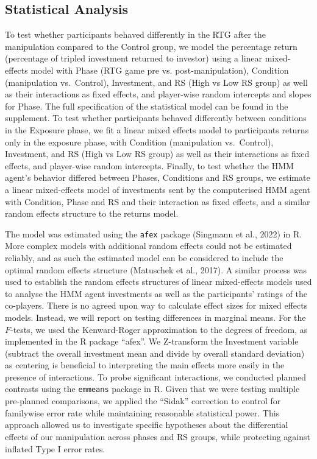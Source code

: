 \documentclass[
]{article}
\begin{document}
\subsection{Statistical Analysis}\label{statistical-analysis}

To test whether participants behaved differently in the RTG after the
manipulation compared to the Control group, we model the percentage
return (percentage of tripled investment returned to investor) using a
linear mixed-effects model with Phase (RTG game pre vs.
post-manipulation), Condition (manipulation vs.~Control), Investment,
and RS (High vs Low RS group) as well as their interactions as fixed
effects, and player-wise random intercepts and slopes for Phase. The
full specification of the statistical model can be found in the
supplement. To test whether participants behaved differently between
conditions in the Exposure phase, we fit a linear mixed effects model to
participants returns only in the exposure phase, with Condition
(manipulation vs.~Control), Investment, and RS (High vs Low RS group) as
well as their interactions as fixed effects, and player-wise random
intercepts. Finally, to test whether the HMM agent's behavior differed
between Phases, Conditions and RS groups, we estimate a linear
mixed-effects model of investments sent by the computerised HMM agent
with Condition, Phase and RS and their interaction as fixed effects, and
a similar random effects structure to the returns model.

The model was estimated using the \texttt{afex} package (Singmann et al., 2022)
in R. More complex models with additional random effects could not be
estimated reliably, and as such the estimated model can be considered to
include the optimal random effects structure
(Matuschek et al., 2017). A similar process was used to establish the
random effects structures of linear mixed-effects models used to analyse
the HMM agent investments as well as the participants' ratings of the
co-players. There is no agreed upon way to calculate effect sizes for
mixed effects models. Instead, we will report on testing differences in
marginal means. For the \(F\)-tests, we used the Kenward-Roger
approximation to the degrees of freedom, as implemented in the R package
``afex''. We Z-transform the Investment variable (subtract the overall
investment mean and divide by overall standard deviation) as centering
is beneficial to interpreting the main effects more easily in the
presence of interactions. To probe significant interactions, we
conducted planned contrasts using the \texttt{emmeans} package in R. Given that
we were testing multiple pre-planned comparisons, we applied the ``Sidak''
correction to control for familywise error rate while maintaining
reasonable statistical power. This approach allowed us to investigate
specific hypotheses about the differential effects of our manipulation
across phases and RS groups, while protecting against inflated Type I
error rates.
\end{document}
